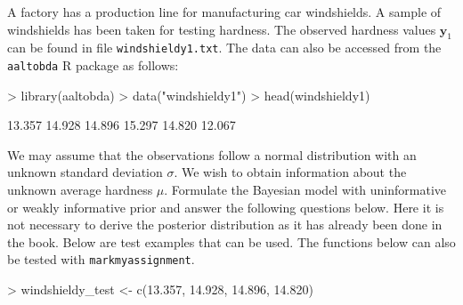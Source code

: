 \documentclass[a4paper,11pt]{article}
\begin{document}
A factory has a production line for manufacturing car windshields. 
A sample of windshields has been taken for testing hardness. The
observed hardness values $\mathbf{y}_1$ can be found in file 
{\tt windshieldy1.txt}. The data
can also be accessed from the {\tt aaltobda} R package as follows:

\begin{Schunk}
\begin{Sinput}
> library(aaltobda)
> data("windshieldy1")
> head(windshieldy1)
\end{Sinput}
\begin{Soutput}
[1] 13.357 14.928 14.896 15.297 14.820 12.067
\end{Soutput}
\end{Schunk}

We may assume that the observations follow a normal distribution with an unknown standard deviation $\sigma$. We wish to obtain information about the unknown average hardness $\mu$. Formulate the Bayesian model
with uninformative or weakly informative prior and answer the
following questions below. Here it is not necessary to derive the posterior distribution as it has already been done in the book. Below are test examples that can be used. The functions below can also be tested with \texttt{markmyassignment}. 

\begin{Schunk}
\begin{Sinput}
> windshieldy_test <- c(13.357, 14.928, 14.896, 14.820)
\end{Sinput}
\end{Schunk}

\end{document}
